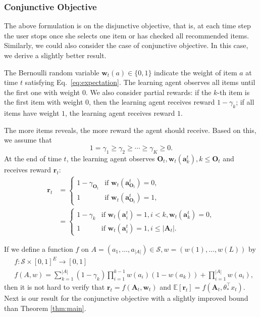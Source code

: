\documentclass{article}
\newcommand{\EE}{\mathbb{E}}
\newcommand{\bA}{\mathbf{A}}
\newcommand{\ba}{\mathbf{a}}
\newcommand{\bO}{\mathbf{O}}
\newcommand{\br}{\mathbf{r}}
\newcommand{\bw}{\mathbf{w}}
\newcommand{\cS}{\mathcal{S}}
\newcommand{\abs}[1]{\left| #1 \right|}
\begin{document}
\subsubsection{Conjunctive Objective}
\label{sec:conj}

The above formulation is on the disjunctive objective, that is, at each time step the user stops once she selects one item or has checked all recommended items. Similarly, we could also consider the case of conjunctive objective. In this case, we derive a slightly better result.

The Bernoulli random variable $\bw_{t}(a) \in \{0,1\}$ indicate the weight of item $a$ at time $t$ satisfying Eq.~\eqref{eq:expectation}. The learning agent observes all items until the first one with weight $0$. We also consider partial rewards: if the $k$-th item is the first item with weight $0$, then the learning agent receives reward $1-\gamma_k$; if all items have weight $1$, the learning agent receives reward $1$. 

The more items reveals, the more reward the agent should receive. Based on this, we assume that
$$
1 = \gamma_1 \geq \gamma_2 \geq \cdots \geq \gamma_K \geq 0.
$$
At the end of time $t$, the learning agent observes $\bO_{t}, \bw_t(\ba_k^t), k \leq \bO_{t}$ and receives reward $\br_{t}$:
\begin{align*}
	\br_{t} &= \begin{cases}
		1 - \gamma_{\bO_{t}}  &\text{if } \bw_t(\ba_{\bO_{t}}^t) = 0,\\
		1 &\text{if } \bw_t(\ba_{\bO_{t}}^t) = 1,
	\end{cases}\\
	&=\begin{cases}
		1-\gamma_{k}  &\text{if } \bw_t(\ba_{i}^t) = 1, i < k, \bw_t(\ba_{k}^t) = 0,\\
		1 &\text{if } \bw_t(\ba_{i}^t) = 1, i\leq \abs{\bA_t}.
	\end{cases}
\end{align*}

If we define a function $f$ on $A = (a_1, \ldots, a_{\abs{A}}) \in \cS, w = (w(1), \ldots, w(L))$ by
\begin{align}
	&f: \cS \times [0,1]^E \to [0,1] \nonumber \\
	&f(A,w) = \sum_{k = 1}^{\abs{A}} (1 - \gamma_k) \prod_{i = 1}^{k - 1} w(a_i)(1 - w(a_k)) + \prod_{i=1}^{\abs{A}}w(a_i),
\label{eq:AndRewardFunc}
\end{align}
then it is not hard to verify that $\br_{t} = f(\bA_t, \bw_t)$ and $\EE[\br_{t}] = f(\bA_t, \theta_{\ast}^{\top}x_t)$. Next is our result for the conjunctive objective with a slightly improved bound than Theorem \ref{thm:main}.
\end{document}
